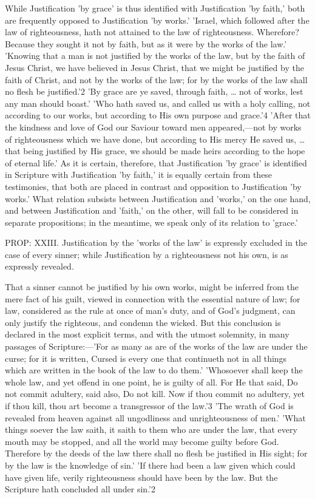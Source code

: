 \documentclass[
]{book}
\begin{document}
While Justification 'by grace' is thus identified with Justification 'by faith,' both are frequently opposed to Justification 'by works.' 'Israel, which followed after the law of righteousness, hath not attained to the law of righteousness. Wherefore? Because they sought it not by faith, but as it were by the works of the law.' 'Knowing that a man is not justified by the works of the law, but by the faith of Jesus Christ, we have believed in Jesus Christ, that we might be justified by the faith of Christ, and not by the works of the law; for by the works of the law shall no flesh be justified.'2 'By grace are ye saved, through faith, \ldots{} not of works, lest any man should boast.' 'Who hath saved us, and called us with a holy calling, not according to our works, but according to His own purpose and grace.'4 'After that the kindness and love of God our Saviour toward men appeared,---not by works of righteousness which we have done, but according to His mercy He saved us, \ldots{} that being justified by His grace, we should be made heirs according to the hope of eternal life.' As it is certain, therefore, that Justification 'by grace' is identified in Scripture with Justification 'by faith,' it is equally certain from these testimonies, that both are placed in contrast and opposition to Justification 'by works.' What relation subsists between Justification and 'works,' on the one hand, and between Justification and 'faith,' on the other, will fall to be considered in separate propositions; in the meantime, we speak only of its relation to 'grace.'

PROP: XXIII. Justification by the 'works of the law' is expressly excluded in the case of every sinner; while Justification by a righteousness not his own, is as expressly revealed.

That a sinner cannot be justified by his own works, might be inferred from the mere fact of his guilt, viewed in connection with the essential nature of law; for law, considered as the rule at once of man's duty, and of God's judgment, can only justify the righteous, and condemn the wicked. But this conclusion is declared in the most explicit terms, and with the utmost solemnity, in many passages of Scripture:---'For as many as are of the works of the law are under the curse; for it is written, Cursed is every one that continueth not in all things which are written in the book of the law to do them.' 'Whosoever shall keep the whole law, and yet offend in one point, he is guilty of all. For He that said, Do not commit adultery, said also, Do not kill. Now if thou commit no adultery, yet if thou kill, thou art become a transgressor of the law.'3 'The wrath of God is revealed from heaven against all ungodliness and unrighteousness of men.' 'What things soever the law saith, it saith to them who are under the law, that every mouth may be stopped, and all the world may become guilty before God. Therefore by the deeds of the law there shall no flesh be justified in His sight; for by the law is the knowledge of sin.' 'If there had been a law given which could have given life, verily righteousness should have been by the law. But the Scripture hath concluded all under sin.'2
\end{document}
